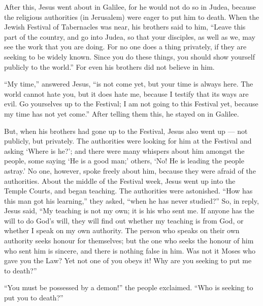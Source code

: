  After this, Jesus went about in Galilee, for he would not
do so in Judea, because the religious authorities (in Jerusalem) were
eager to put him to death.  When the Jewish Festival of
Tabernacles was near,  his brothers said to him, ``Leave
this part of the country, and go into Judea, so that your disciples, as
well as we, may see the work that you are doing.  For no one
does a thing privately, if they are seeking to be widely known. Since
you do these things, you should show yourself publicly to the world.''
 For even his brothers did not believe in him.

 ``My time,'' answered Jesus, ``is not come yet, but your
time is always here.  The world cannot hate you, but it does
hate me, because I testify that its ways are evil.  Go
yourselves up to the Festival; I am not going to this Festival yet,
because my time has not yet come.''  After telling them
this, he stayed on in Galilee.

 But, when his brothers had gone up to the Festival, Jesus
also went up --- not publicly, but privately.  The
authorities were looking for him at the Festival and asking `Where is
he?';  and there were many whispers about him amongst the
people, some saying `He is a good man;' others, `No! He is leading the
people astray.'  No one, however, spoke freely about him,
because they were afraid of the authorities.  About the
middle of the Festival week, Jesus went up into the Temple Courts, and
began teaching.  The authorities were astonished. ``How has
this man got his learning,'' they asked, ``when he has never studied?''
 So, in reply, Jesus said, ``My teaching is not my own; it
is his who sent me.  If anyone has the will to do God's
will, they will find out whether my teaching is from God, or whether I
speak on my own authority.  The person who speaks on their
own authority seeks honour for themselves; but the one who seeks the
honour of him who sent him is sincere, and there is nothing false in
him.  Was not it Moses who gave you the Law? Yet not one of
you obeys it! Why are you seeking to put me to death?''

 ``You must be possessed by a demon!'' the people
exclaimed. ``Who is seeking to put you to death?''

